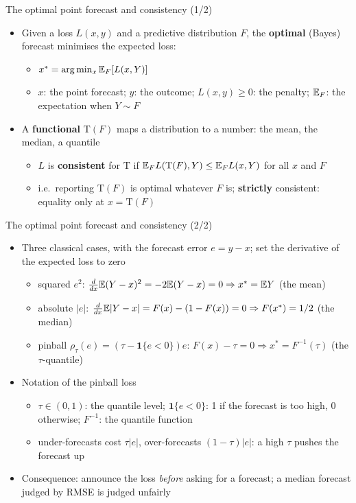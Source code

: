 \begin{frame}{The optimal point forecast and consistency (1/2)}
\itemsize{\small}
\begin{itemize}
    \item Given a loss $L(x, y)$ and a predictive distribution $F$, the \textbf{optimal} (Bayes) forecast minimises the expected loss:
    \begin{itemize}
        \item $x^* = \arg\min_x \mathbb{E}_F[L(x, Y)]$
        \item $x$: the point forecast; $y$: the outcome; $L(x, y) \ge 0$: the penalty; $\mathbb{E}_F$: the expectation when $Y \sim F$
    \end{itemize}
    \item A \textbf{functional} $\mathrm{T}(F)$ maps a distribution to a number: the mean, the median, a quantile
    \begin{itemize}
        \item $L$ is \textbf{consistent} for $\mathrm{T}$ if $\mathbb{E}_F L(\mathrm{T}(F), Y) \le \mathbb{E}_F L(x, Y)$ for all $x$ and $F$ 
        \item i.e.\ reporting $\mathrm{T}(F)$ is optimal whatever $F$ is; \textbf{strictly} consistent: equality only at $x = \mathrm{T}(F)$
    \end{itemize}
\end{itemize}
\end{frame}

\begin{frame}{The optimal point forecast and consistency (2/2)}
\itemsize{\small}
\begin{itemize}
    \item Three classical cases, with the forecast error $e = y - x$; set the derivative of the expected loss to zero
    \begin{itemize}
        \item squared $e^2$: $\frac{d}{dx}\mathbb{E}(Y - x)^2 = -2\mathbb{E}(Y - x) = 0 \Rightarrow x^* = \mathbb{E} Y$ (the mean)
        \item absolute $|e|$: $\frac{d}{dx}\mathbb{E}|Y - x| = F(x) - (1 - F(x)) = 0 \Rightarrow F(x^*) = 1/2$ (the median)
        \item pinball $\rho_\tau(e) = (\tau - \mathbf 1\{e < 0\})e$: $F(x) - \tau = 0 \Rightarrow x^* = F^{-1}(\tau)$ (the $\tau$-quantile)
    \end{itemize}
    \item Notation of the pinball loss
    \begin{itemize}
        \item $\tau \in (0, 1)$: the quantile level; $\mathbf 1\{e < 0\}$: 1 if the forecast is too high, 0 otherwise; $F^{-1}$: the quantile function
        \item under-forecasts cost $\tau|e|$, over-forecasts $(1 - \tau)|e|$: a high $\tau$ pushes the forecast up
    \end{itemize}
    \item Consequence: announce the loss \emph{before} asking for a forecast; a median forecast judged by RMSE is judged unfairly 
\end{itemize}
\end{frame}

